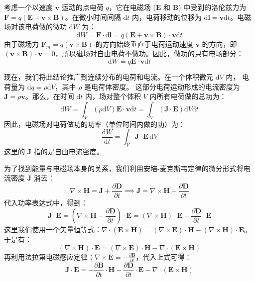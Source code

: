 \documentclass[fontset=none]{ctexart}
\begin{document}
考虑一个以速度 $\bm{v}$ 运动的点电荷 $q$，它在电磁场 ($\bm{E}$ 和 $\bm{B}$) 中受到的洛伦兹力为 $\bm{F} = q(\bm{E} + \bm{v} \times \bm{B})$。在微小时间间隔 $\mathrm{d}t$ 内，电荷移动的位移为 $\mathrm{d}\bm{l} = \bm{v}\mathrm{d}t$。电磁场对该电荷做的微功 $\mathrm{d}W$ 为：
\begin{equation}
    \mathrm{d}W = \bm{F} \cdot \mathrm{d}\bm{l} = q(\bm{E} + \bm{v} \times \bm{B}) \cdot \bm{v}\mathrm{d}t
\end{equation}
由于磁场力 $\bm{F}_m = q(\bm{v} \times \bm{B})$ 的方向始终垂直于电荷运动速度 $\bm{v}$ 的方向，即 $(\bm{v} \times \bm{B}) \cdot \bm{v} = 0$，所以磁场对自由电荷不做功。因此，做功的只有电场部分：
\begin{equation}
    \mathrm{d}W = q\bm{E} \cdot \bm{v}\mathrm{d}t
\end{equation}

现在，我们将此结论推广到连续分布的电荷和电流。在一个体积微元 $\mathrm{d}V$ 内，
电荷量为 $\mathrm{d}q = \rho \mathrm{d}V$，其中 $\rho$ 是电荷体密度。
这部分电荷运动形成的电流密度为 $\bm{J} = \rho \bm{v}$。那么，在时间 $\mathrm{d}t$ 内，场对整个体积 $V$ 内所有电荷做的总功为：
\begin{equation}
    \mathrm{d}W = \int_V (\rho \mathrm{d}V) \bm{E} \cdot \bm{v} \mathrm{d}t = \int_V (\bm{J} \cdot \bm{E}) \mathrm{d}V \mathrm{d}t
\end{equation}
因此，电磁场对电荷做功的功率（单位时间内做的功）为：
\begin{equation}
    \frac{\mathrm{d}W}{\mathrm{d}t} = \int_V \bm{J} \cdot \bm{E} \, \mathrm{d}V
\end{equation}
这里的 $\bm{J}$ 指的是自由电流密度。

为了找到能量与电磁场本身的关系，我们利用安培-麦克斯韦定律的微分形式将电流密度 $\bm{J}$ 消去：
\begin{equation}
    \nabla \times \bm{H} = \bm{J} + \frac{\partial \bm{D}}{\partial t} \implies \bm{J} = \nabla \times \bm{H} - \frac{\partial \bm{D}}{\partial t}
\end{equation}
代入功率表达式中，得到：
\begin{equation}
    \bm{J} \cdot \bm{E} = \left(\nabla \times \bm{H} - \frac{\partial \bm{D}}{\partial t}\right) \cdot \bm{E} = (\nabla \times \bm{H}) \cdot \bm{E} - \frac{\partial \bm{D}}{\partial t} \cdot \bm{E}
\end{equation}
这里我们使用一个矢量恒等式：$\nabla \cdot (\bm{E} \times \bm{H}) = (\nabla \times \bm{E}) \cdot \bm{H} - (\nabla \times \bm{H}) \cdot \bm{E}$。于是有：
\begin{equation}
    (\nabla \times \bm{H}) \cdot \bm{E} = (\nabla \times \bm{E}) \cdot \bm{H} - \nabla \cdot (\bm{E} \times \bm{H})
\end{equation}
再利用法拉第电磁感应定律：$\nabla \times \bm{E} = -\frac{\partial \bm{B}}{\partial t}$，代入上式可得：
\begin{equation}
    \bm{J} \cdot \bm{E} = -\frac{\partial \bm{B}}{\partial t} \cdot \bm{H} 
    - \frac{\partial \bm{D}}{\partial t} \cdot \bm{E} - \nabla \cdot (\bm{E} \times \bm{H})
\end{equation}
\end{document}
